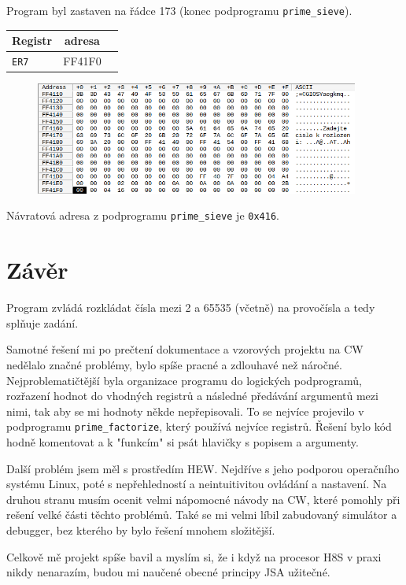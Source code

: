 \documentclass[12pt]{article}
\newcommand{\code}[1]{\mbox{\texttt{#1}}}
\begin{document}
Program byl zastaven na řádce 173 (konec podprogramu \code{prime\_sieve}).

\begin{table}[H]
	\centering
	\begin{tabular}{|l|c|r|}
		\hline
		Registr    & adresa \\ \hline
		\code{ER7} & FF41F0 \\ \hline
	\end{tabular}
\end{table}

\begin{figure}[H]
	\begin{center}
		\includegraphics[width=0.95\textwidth]{pic/memory.png}
	\end{center}
\end{figure}

Návratová adresa z podprogramu \code{prime\_sieve} je \code{0x416}.

\section{Závěr}

Program zvládá rozkládat čísla mezi 2 a 65535 (včetně) na provočísla a tedy
splňuje zadání.

Samotné řešení mi po prečtení dokumentace a vzorových projektu na CW nedělalo
značné problémy, bylo spíše pracné a zdlouhavé než náročné. Nejproblematičtější
byla organizace programu do logických podprogramů, rozřazení hodnot do vhodných
registrů a následné předávání argumentů mezi nimi, tak aby se mi hodnoty někde
nepřepisovali. To se nejvíce projevilo v podprogramu \code{prime\_factorize},
který používá nejvíce registrů. Řešení bylo kód hodně komentovat a k "funkcím"
si psát hlavičky s popisem a argumenty.

Další problém jsem měl s prostředím HEW. Nejdříve s jeho podporou operačního
systému Linux, poté s nepřehledností a neintuitivitou ovládání a nastavení. Na
druhou stranu musím ocenit velmi nápomocné návody na CW, které pomohly při
rešení velké části těchto problémů. Také se mi velmi líbil zabudovaný simulátor
a debugger, bez kterého by bylo řešení mnohem složitější.

Celkově mě projekt spíše bavil a myslím si, že i když na procesor H8S v praxi
nikdy nenarazím, budou mi naučené obecné principy JSA užitečné.
\end{document}
